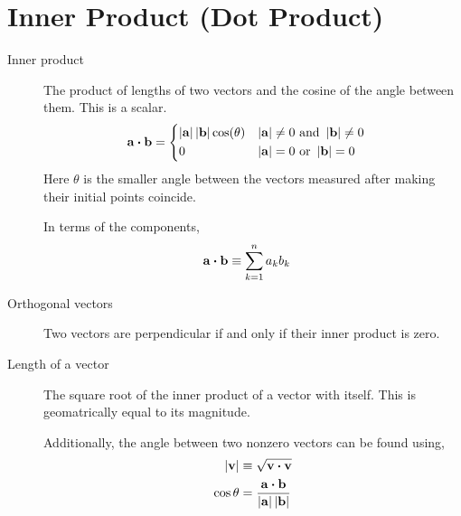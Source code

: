 \section{Inner Product (Dot Product)}
\begin{description}
    \item[Inner product] The product of lengths of two vectors and the cosine of the angle
        between them. This is a scalar.
        \begin{align}
            \mathbf{a} \boldsymbol{\cdot} \mathbf{b} &
            = \begin{dcases}
                  \left\lvert \mathbf{a} \right\rvert \left\lvert \mathbf{b} \right\rvert \cos(\theta) &
                  \left\lvert \mathbf{a} \right\rvert \neq 0\ \text{and}\ \left\lvert \mathbf{b} \right\rvert \neq 0 \\
                  0                                        &
                  \left\lvert \mathbf{a} \right\rvert = 0\ \text{or}\ \left\lvert \mathbf{b} \right\rvert = 0
              \end{dcases}
        \end{align}
        Here $ \theta $ is the smaller angle between the vectors measured after
        making their initial points coincide. \par
        In terms of the components,
        \begin{align}
            \mathbf{a} \boldsymbol{\cdot} \mathbf{b} & \equiv \sum_{k=1}^{n} a_k b_k
        \end{align}

    \item[Orthogonal vectors] Two vectors are perpendicular if and only if their
        inner product is zero.

    \item[Length of a vector] The square root of the inner product of a vector with
        itself. This is geomatrically equal to its magnitude. \par
        Additionally, the angle between two nonzero vectors can be found using,
        \begin{align}
            \left\lvert \mathbf{v} \right\rvert & \equiv \sqrt{\mathbf{v} \boldsymbol{\cdot} \mathbf{v}} \\
            \cos \theta   & = \frac{\mathbf{a} \boldsymbol{\cdot} \mathbf{b}}
            {\left\lvert \mathbf{a} \right\rvert \left\lvert \mathbf{b} \right\rvert}
        \end{align}


\end{description}
